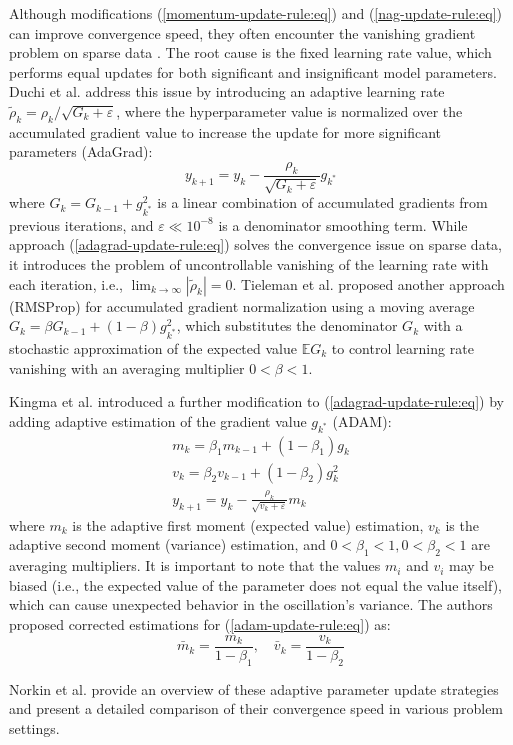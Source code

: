 Although modifications (\ref{momentum-update-rule:eq}) and (\ref{nag-update-rule:eq}) can improve convergence speed, they often encounter the vanishing gradient problem on sparse data \cite{Bottou_Curtis_Nocedal_2018}. The root cause is the fixed learning rate value, which performs equal updates for both significant and insignificant model parameters. Duchi et al. \cite{Duchi_2011} address this issue by introducing an adaptive learning rate $\tilde{\rho}_k = \rho_k / \sqrt{G_k + \varepsilon}$, where the hyperparameter value is normalized over the accumulated gradient value to increase the update for more significant parameters (AdaGrad):
\begin{equation}
    \label{adagrad-update-rule:eq}
        y_{k+1} = y_k - \frac{\rho_k}{\sqrt{G_k + \varepsilon}} g_{k^*}
\end{equation}
\noindent where $G_k = G_{k-1} + g_{k^*}^2$ is a linear combination of accumulated gradients from previous iterations, and $\varepsilon \ll 10^{-8}$ is a denominator smoothing term. While approach (\ref{adagrad-update-rule:eq}) solves the convergence issue on sparse data, it introduces the problem of uncontrollable vanishing of the learning rate with each iteration, i.e., $\lim_{k \to \infty} | \tilde{\rho}_k | = 0$. Tieleman et al. \cite{tieleman2012rmsprop} proposed another approach (RMSProp) for accumulated gradient normalization using a moving average $G_k = \beta G_{k-1} + (1 - \beta) g_{k^*}^2$, which substitutes the denominator $G_k$ with a stochastic approximation of the expected value $\mathbb{E} G_k$ to control learning rate vanishing with an averaging multiplier $0 < \beta < 1$.

Kingma et al. \cite{kingma2017adam} introduced a further modification to (\ref{adagrad-update-rule:eq}) by adding adaptive estimation of the gradient value $g_{k^*}$ (ADAM):
\begin{eqnarray}
    \label{adam-update-rule:eq}
        m_k = \beta_1 m_{k-1} + (1 - \beta_1) g_k \nonumber \\
        v_k = \beta_2 v_{k-1} + (1 - \beta_2) g_k^2 \nonumber \\
        y_{k+1} = y_k - \frac{\rho_k}{\sqrt{v_k + \varepsilon}} m_k
\end{eqnarray}
\noindent where $m_k$ is the adaptive first moment (expected value) estimation, $v_k$ is the adaptive second moment (variance) estimation, and $0 < \beta_1 < 1, 0 < \beta_2 < 1$ are averaging multipliers. It is important to note that the values $m_i$ and $v_i$ may be biased (i.e., the expected value of the parameter does not equal the value itself), which can cause unexpected behavior in the oscillation's variance. The authors proposed corrected estimations for (\ref{adam-update-rule:eq}) as:
\begin{equation}
    \label{adam-corrected-estimations:eq}
        \bar{m}_k = \frac{m_k}{1 - \beta_1}, \quad \bar{v}_k = \frac{v_k}{1 - \beta_2}
\end{equation}

Norkin et al. \cite{Norkin_Kozyriev_Norkin_2024} provide an overview of these adaptive parameter update strategies and present a detailed comparison of their convergence speed in various problem settings.
